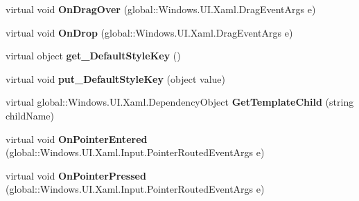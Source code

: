 \begin{DoxyCompactItemize}
\item 
\mbox{\label{class_windows_1_1_u_i_1_1_xaml_1_1_controls_1_1_control_a5c8a657f99279b16e32bf35998d46838}} 
virtual void {\bfseries On\+Drag\+Over} (global\+::\+Windows.\+U\+I.\+Xaml.\+Drag\+Event\+Args e)
\item 
\mbox{\label{class_windows_1_1_u_i_1_1_xaml_1_1_controls_1_1_control_ade79c678fe0c5aa32e43c4772d34e61e}} 
virtual void {\bfseries On\+Drop} (global\+::\+Windows.\+U\+I.\+Xaml.\+Drag\+Event\+Args e)
\item 
\mbox{\label{class_windows_1_1_u_i_1_1_xaml_1_1_controls_1_1_control_a0f6b7d0a6e0dbad0ff65dd5861c20050}} 
virtual object {\bfseries get\+\_\+\+Default\+Style\+Key} ()
\item 
\mbox{\label{class_windows_1_1_u_i_1_1_xaml_1_1_controls_1_1_control_a6cc396f98c5876ae256d5b6d1c78ded9}} 
virtual void {\bfseries put\+\_\+\+Default\+Style\+Key} (object value)
\item 
\mbox{\label{class_windows_1_1_u_i_1_1_xaml_1_1_controls_1_1_control_ac603c14d7442a0aa06e00197591e9394}} 
virtual global\+::\+Windows.\+U\+I.\+Xaml.\+Dependency\+Object {\bfseries Get\+Template\+Child} (string child\+Name)
\item 
\mbox{\label{class_windows_1_1_u_i_1_1_xaml_1_1_controls_1_1_control_ae3e99583865513e0de94e3c419b26924}} 
virtual void {\bfseries On\+Pointer\+Entered} (global\+::\+Windows.\+U\+I.\+Xaml.\+Input.\+Pointer\+Routed\+Event\+Args e)
\item 
\mbox{\label{class_windows_1_1_u_i_1_1_xaml_1_1_controls_1_1_control_a72d13df130e7f9b6c8cc7fbbf022be49}} 
virtual void {\bfseries On\+Pointer\+Pressed} (global\+::\+Windows.\+U\+I.\+Xaml.\+Input.\+Pointer\+Routed\+Event\+Args e)
\item 
\mbox{\label{class_windows_1_1_u_i_1_1_xaml_1_1_controls_1_1_control_ae671c763ce297220751cee1945c9265b}} 

\end{DoxyCompactItemize}
